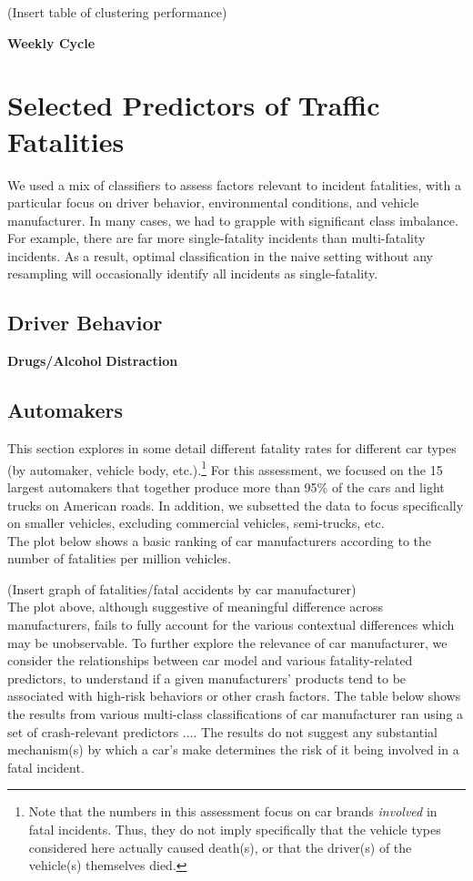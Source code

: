 \documentclass[11pt, oneside]{article}   	%
\begin{document}
(Insert table of clustering performance)

\textbf{Weekly Cycle} \\

\section*{Selected Predictors of Traffic Fatalities}
We used a mix of classifiers to assess factors relevant to incident fatalities, with a particular focus on driver behavior, environmental conditions, and vehicle manufacturer. In many cases, we had to grapple with significant class imbalance. For example, there are far more single-fatality incidents than multi-fatality incidents. As a result, optimal classification in the naive setting without any resampling will occasionally identify all incidents as single-fatality.   

\subsection*{Driver Behavior}
\textbf{Drugs/Alcohol}
\textbf{Distraction}

\subsection*{Automakers}

This section explores in some detail different fatality rates for different car types (by automaker, vehicle body, etc.).\footnote{Note that the numbers in this assessment focus on car brands \textit{involved} in fatal incidents. Thus, they do not imply specifically that the vehicle types considered here actually caused death(s), or that the driver(s) of the vehicle(s) themselves died.} For this assessment, we focused on the 15 largest automakers that together produce more than 95\% of the cars and light trucks on American roads. In addition, we subsetted the data to focus specifically on smaller vehicles, excluding commercial vehicles, semi-trucks, etc. \\

The plot below shows a basic ranking of car manufacturers according to the number of fatalities per million vehicles.

(Insert graph of fatalities/fatal accidents by car manufacturer) \\


The plot above, although suggestive of meaningful difference across manufacturers, fails to fully account for the various contextual differences which may be unobservable. To further explore the relevance of car manufacturer, we consider the relationships between car model and various fatality-related predictors, to understand if a given manufacturers' products tend to be associated with high-risk behaviors or other crash factors. The table below shows the results from various multi-class classifications of car manufacturer ran using a set of crash-relevant predictors .... The results do not suggest any substantial mechanism(s) by which a car's make determines the risk of it being involved in a fatal incident. \\
\end{document}
